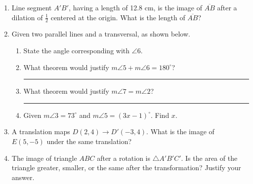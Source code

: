 \documentclass[12pt, twoside]{article}
\begin{document}
\begin{enumerate}
  
\newpage

\item Line segment $A'B'$, having a length of 12.8 cm, is the image of $\overline{AB}$ after a dilation of $\displaystyle \frac{1}{2}$ centered at the origin. What is the length of $\overline{AB}$? \vspace{4cm}
  

\item Given two parallel lines and a transversal, as shown below.
  \begin{center}
  \end{center}
  \begin{enumerate}
    \item State the angle corresponding with $\angle 6$. \vspace{0.5cm}
    \item What theorem would justify $m\angle 5 + m\angle 6 =180^\circ$? \rule{6cm}{0.15mm} \vspace{0.5cm}
    \item What theorem would justify $m\angle 7 = m\angle 2$? \rule{7cm}{0.15mm} \vspace{0.5cm}
    \item Given $m\angle 3 = 73^\circ$ and $m\angle 5 = (3x-1)^\circ$. Find $x$. \vspace{5cm}
  \end{enumerate}

\newpage
\item A translation maps $D(2,4) \rightarrow D'(-3,4)$. What is the image of $E(5,-5)$ under the same translation?  \vspace{3.5cm}

\item The image of triangle $ABC$ after a rotation is $\triangle A'B'C'$. Is the area of the triangle greater, smaller, or the same after the transformation? Justify your answer. \vspace{3.5cm}


\end{enumerate}
\end{document}
